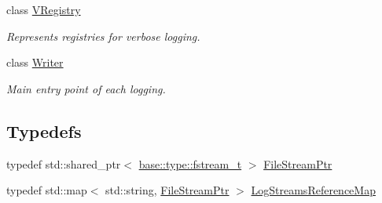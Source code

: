 \begin{DoxyCompactItemize}
class \hyperlink{classel_1_1base_1_1_v_registry}{V\+Registry}
\begin{DoxyCompactList}\small\item\em Represents registries for verbose logging. \end{DoxyCompactList}\item 
class \hyperlink{classel_1_1base_1_1_writer}{Writer}
\begin{DoxyCompactList}\small\item\em Main entry point of each logging. \end{DoxyCompactList}\end{DoxyCompactItemize}
\subsection*{Typedefs}
\begin{DoxyCompactItemize}
\item 
typedef std\+::shared\+\_\+ptr$<$ \hyperlink{namespaceel_1_1base_1_1type_a620c830ead75d26b45c060c211ee2685}{base\+::type\+::fstream\+\_\+t} $>$ \hyperlink{namespaceel_1_1base_a8b10bcfd674533f8340cd8c39fbf5233}{File\+Stream\+Ptr}
\item 
typedef std\+::map$<$ std\+::string, \hyperlink{namespaceel_1_1base_a8b10bcfd674533f8340cd8c39fbf5233}{File\+Stream\+Ptr} $>$ \hyperlink{namespaceel_1_1base_af7602da9fe1d6c75985184fb0e39fd11}{Log\+Streams\+Reference\+Map}
\end{DoxyCompactItemize}
